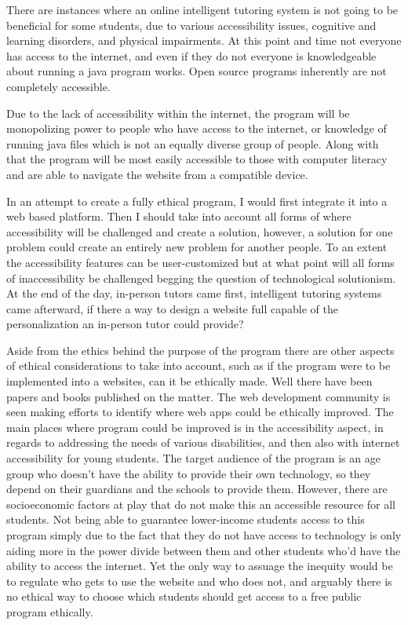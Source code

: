 \documentclass[10pt,twocolumn]{article}
\begin{document}
There are instances where an online intelligent tutoring system is not going to be beneficial for some students, due to various accessibility issues, cognitive and learning disorders, and physical impairments. At this point and time not everyone has access to the internet, and even if they do not everyone is knowledgeable about running a java program works. Open source programs inherently are not completely accessible.

Due to the lack of accessibility within the internet, the program will be monopolizing power to people who have access to the internet, or knowledge of running java files which is not an equally diverse group of people. Along with that the program will be most easily accessible to those with computer literacy and are able to navigate the website from a compatible device. 

In an attempt to create a fully ethical program, I would first integrate it into a web based platform. Then I should take into account all forms of where accessibility will be challenged and create a solution, however, a solution for one problem could create an entirely new problem for another people. To an extent the accessibility features can be user-customized but at what point will all forms of inaccessibility be challenged begging the question of technological solutionism. At the end of the day, in-person tutors came first, intelligent tutoring systems came afterward, if there a way to design a website full capable of the personalization an in-person tutor could provide?

Aside from the ethics behind the purpose of the program there are other aspects of ethical considerations to take into account, such as if the program were to be implemented into a  websites, can it be ethically made. Well there have been papers and books published on the matter. The web development community is seen making efforts to identify where web apps could be ethically improved. The main places where program could be improved is in the accessibility aspect, in regards to addressing the needs of various disabilities, and then also with internet accessibility for young students. The target audience of the program is an age group who doesn't have the ability to provide their own technology, so they depend on their guardians and the schools to provide them. However, there are socioeconomic factors at play that do not make this an accessible resource for all students. Not being able to guarantee lower-income students access to this program simply due to the fact that they do not have access to technology is only aiding more in the power divide between them and other students who'd have the ability to access the internet. Yet the only way to assuage the inequity would be to regulate who gets to use the website and who does not, and arguably there is no ethical way to choose which students should get access to a free public program ethically.  
\end{document}

